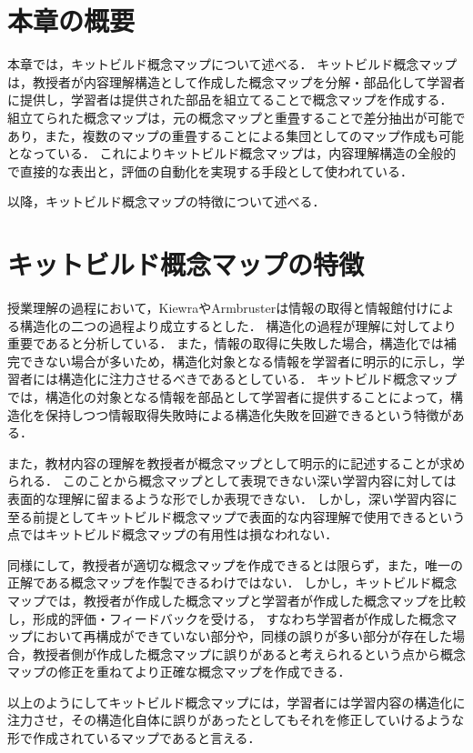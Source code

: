\section{本章の概要}
本章では，キットビルド概念マップについて述べる．
キットビルド概念マップ\cite{kit}\cite{kit2}は，教授者が内容理解構造として作成した概念マップを分解・部品化して学習者に提供し，学習者は提供された部品を組立てることで概念マップを作成する．
組立てられた概念マップは，元の概念マップと重畳することで差分抽出が可能であり，また，複数のマップの重畳することによる集団としてのマップ作成も可能となっている．
これによりキットビルド概念マップは，内容理解構造の全般的で直接的な表出と，評価の自動化を実現する手段として使われている．

以降，キットビルド概念マップの特徴について述べる．

\section{キットビルド概念マップの特徴}
授業理解の過程において，Kiewra\cite{kiewra}やArmbruster\cite{armbruster}は情報の取得と情報館付けによる構造化の二つの過程より成立するとした．
構造化の過程が理解に対してより重要であると分析している．
また，情報の取得に失敗した場合，構造化では補完できない場合が多いため，構造化対象となる情報を学習者に明示的に示し，学習者には構造化に注力させるべきであるとしている．
キットビルド概念マップでは，構造化の対象となる情報を部品として学習者に提供することによって，構造化を保持しつつ情報取得失敗時による構造化失敗を回避できるという特徴がある．

また，教材内容の理解を教授者が概念マップとして明示的に記述することが求められる．
このことから概念マップとして表現できない深い学習内容に対しては表面的な理解に留まるような形でしか表現できない．
しかし，深い学習内容に至る前提としてキットビルド概念マップで表面的な内容理解で使用できるという点ではキットビルド概念マップの有用性は損なわれない．

同様にして，教授者が適切な概念マップを作成できるとは限らず，また，唯一の正解である概念マップを作製できるわけではない．
しかし，キットビルド概念マップでは，教授者が作成した概念マップと学習者が作成した概念マップを比較し，形成的評価・フィードバックを受ける，
すなわち学習者が作成した概念マップにおいて再構成ができていない部分や，同様の誤りが多い部分が存在した場合，教授者側が作成した概念マップに誤りがあると考えられるという点から概念マップの修正を重ねてより正確な概念マップを作成できる．

以上のようにしてキットビルド概念マップには，学習者には学習内容の構造化に注力させ，その構造化自体に誤りがあったとしてもそれを修正していけるような形で作成されているマップであると言える．